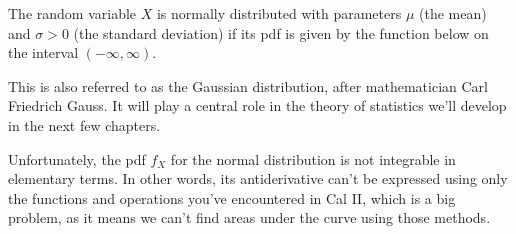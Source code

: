 \begin{defn}The random variable $X$ is normally distributed with parameters $\mu$ (the mean) and $\sigma > 0$ (the standard deviation) if its pdf is given by the function below on the interval $(-\infty,\infty)$.
\renewcommand*{\arraystretch}{1.35}
\renewcommand*{\arraystretch}{1}

\begin{center}
    \begin{minipage}{.5\textwidth}
        \centering
    \end{minipage}%
    \begin{minipage}{0.5\textwidth}
        \centering
\end{minipage}
\end{center}

\end{defn}
\par
This is also referred to as the Gaussian distribution, after mathematician Carl Friedrich Gauss. It will play a central role in the theory of statistics we'll develop in the next few chapters. 
\par
\rmk Unfortunately, the pdf $f_X$ for the normal distribution is not integrable in elementary terms. In other words, its antiderivative can't be expressed using only the functions and operations you've encountered in Cal II, which is a big problem, as it means we can't find areas under the curve using those methods.
